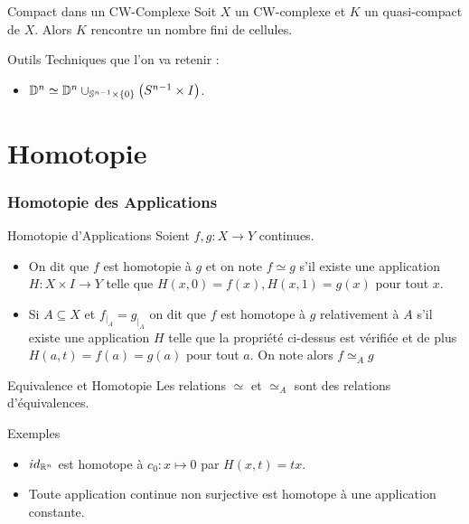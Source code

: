 \documentclass{cours}
\begin{document}
\begin{propositionfr}{Compact dans un CW-Complexe}{}
    Soit $X$ un CW-complexe et $K$ un quasi-compact de $X$. Alors $K$ rencontre un nombre fini de cellules. 
\end{propositionfr}

Outils Techniques que l'on va retenir : 
\begin{itemize}
    \item $\mathbb{D}^{n} \simeq \mathbb{D}^{n} \cup_{\mathbb{S}^{n - 1} \times \{0\}} \left(S^{n - 1} \times I\right)$.
\end{itemize}

\newpage
\part{Homotopie}
\section{Homotopie des Applications}
\begin{définition}{Homotopie d'Applications}{}
    Soient $f, g : X \to Y$ continues. 
    \begin{itemize}
        \item On dit que $f$ est homotopie à $g$ et on note $f \simeq g$ s'il existe une application $H : X \times I \to Y$ telle que $H(x, 0) = f(x), H(x, 1) = g(x)$ pour tout $x$. 
        \item Si $A \subseteq X$ et $f_{\mid_{A}} = g_{\mid_{A}}$ on dit que $f$ est homotope à $g$ relativement à $A$ s'il existe une application $H$ telle que la propriété ci-dessus est vérifiée et de plus $H(a, t) = f(a) = g(a)$ pour tout $a$. On note alors $f \simeq_{A} g$
    \end{itemize}
\end{définition}
\begin{propositionfr}{Equivalence et Homotopie}{}
    Les relations $\simeq$ et $\simeq_{A}$ sont des relations d'équivalences. 
\end{propositionfr}

\begin{propositionfr}{Exemples}{}
    \begin{itemize}
        \item $id_{\mathbb{R}^{n}}$ est homotope à $c_{0} : x \mapsto 0$ par $H(x, t) = tx$.
        \item Toute application continue non surjective est homotope à une application constante.
    \end{itemize}
\end{propositionfr}
\end{document}
